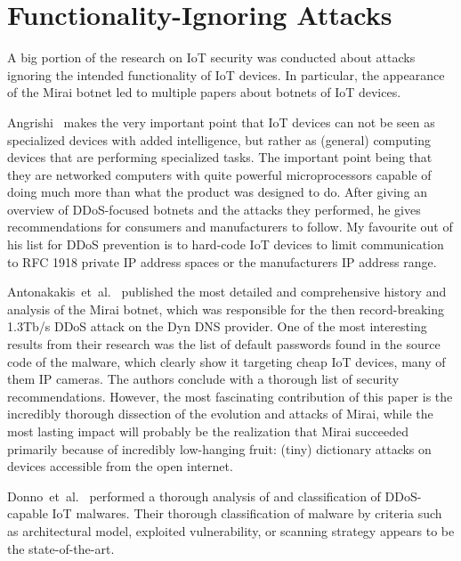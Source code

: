 \documentclass[11pt,a4paper]{article}
\begin{document}
	\section{Functionality-Ignoring Attacks}%
	\label{sec:functionality_ignoring_attacks}
	A big portion of the research on IoT security was conducted about attacks ignoring the intended functionality of IoT devices. In particular, the appearance of the Mirai botnet led to multiple papers about botnets of IoT devices.

	Angrishi~\cite{Angrishi:2017:TitiiiviIb} %
	makes the very important point that IoT devices can not be seen as specialized devices with added intelligence, but rather as (general) computing devices that are performing specialized tasks.
	The important point being that they are networked computers with quite powerful microprocessors capable of doing much more than what the product was designed to do.
	After giving an overview of DDoS-focused botnets and the attacks they performed, he gives recommendations for consumers and manufacturers to follow. My favourite out of his list for DDoS prevention is to hard-code IoT devices to limit communication to RFC 1918 private IP address spaces or the manufacturers IP address range.

	Antonakakis~et~al.~\cite{Antonakakis:2017:UMB} %
	published the most detailed and comprehensive history and analysis of the Mirai botnet, which was responsible for the then record-breaking 1.3Tb/s DDoS attack on the Dyn DNS provider.
	One of the most interesting results from their research was the list of default passwords found in the source code of the malware, which clearly show it targeting cheap IoT devices, many of them IP cameras.
	The authors conclude with a thorough list of security recommendations.
	However, the most fascinating contribution of this paper is the incredibly thorough dissection of the evolution and attacks of Mirai, while the most lasting impact will probably be the realization that Mirai succeeded primarily because of incredibly low-hanging fruit: (tiny) dictionary attacks on devices accessible from the open internet.

	Donno~et~al.~\cite{Donno:2017:ADIM} %
	performed a thorough analysis of and classification of DDoS-capable IoT malwares.
	Their thorough classification of malware by criteria such as architectural model, exploited vulnerability, or scanning strategy appears to be the state-of-the-art.
\end{document}
